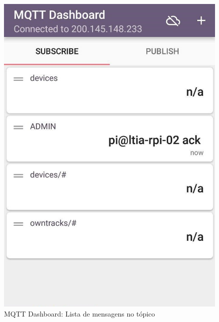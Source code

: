 \begin{figure}[htb]
\begin{minipage}{0.32\textwidth}
		\includegraphics[width=1\textwidth]{052-gateway/mqtt/ad-home-ack.jpg}
	\end{minipage}
\hfill
	\begin{minipage}{0.32\textwidth}
	\centering
		\caption{\label{fig-ad-admin-ack}MQTT Dashboard: Lista de mensagens no tópico}

\end{minipage}
\end{figure}
